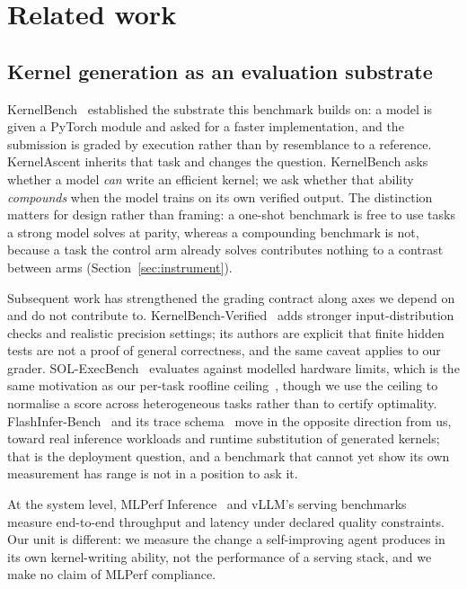 \section{Related work}
\label{sec:related}

\subsection{Kernel generation as an evaluation substrate}

KernelBench~\cite{ouyang2025kernelbench} established the substrate this benchmark builds on:
a model is given a PyTorch module and asked for a faster implementation, and the submission is
graded by execution rather than by resemblance to a reference. KernelAscent inherits that task
and changes the question. KernelBench asks whether a model \emph{can} write an efficient kernel;
we ask whether that ability \emph{compounds} when the model trains on its own verified output.
The distinction matters for design rather than framing: a one-shot benchmark is free to use
tasks a strong model solves at parity, whereas a compounding benchmark is not, because a task
the control arm already solves contributes nothing to a contrast between arms
(Section~\ref{sec:instrument}).

Subsequent work has strengthened the grading contract along axes we depend on and do not
contribute to. KernelBench-Verified~\cite{kernelbenchverified} adds stronger input-distribution
checks and realistic precision settings; its authors are explicit that finite hidden tests are
not a proof of general correctness, and the same caveat applies to our grader.
SOL-ExecBench~\cite{solexecbench} evaluates against modelled hardware limits, which is the same
motivation as our per-task roofline ceiling~\cite{williams2009roofline}, though we use the
ceiling to normalise a score across heterogeneous tasks rather than to certify optimality.
FlashInfer-Bench~\cite{flashinferbench} and its trace schema~\cite{flashinfertrace} move in the
opposite direction from us, toward real inference workloads and runtime substitution of
generated kernels; that is the deployment question, and a benchmark that cannot yet show its own
measurement has range is not in a position to ask it.

At the system level, MLPerf Inference~\cite{mlperfinference} and vLLM's serving
benchmarks~\cite{vllmbench} measure end-to-end throughput and latency under declared quality
constraints. Our unit is different: we measure the change a self-improving agent produces in its
own kernel-writing ability, not the performance of a serving stack, and we make no claim of
MLPerf compliance.

